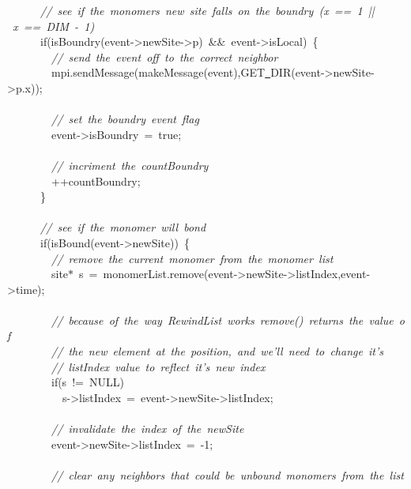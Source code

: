 {\ \ \ \ \ \ \textsl{//\ see\ if\ the\ monomers\ new\ site\ falls\ on\ the\ boundry\ (x\ ==\ 1\ ||\ x\ ==\ DIM\ -{}\ 1)}\\
\ \ \ \ \ \ if(isBoundry(event-{}>{}newSite-{}>{}p)\ \&\&\ event-{}>{}isLocal)\ \{\\
\ \ \ \ \ \ \ \ \textsl{//\ send\ the\ event\ off\ to\ the\ correct\ neighbor}\\
\ \ \ \ \ \ \ \ mpi.sendMessage(makeMessage(event),GET\underline\ DIR(event-{}>{}newSite-{}>{}p.x));\\
\ \\
\ \ \ \ \ \ \ \ \textsl{//\ set\ the\ boundry\ event\ flag}\\
\ \ \ \ \ \ \ \ event-{}>{}isBoundry\ =\ true;\\
\ \\
\ \ \ \ \ \ \ \ \textsl{//\ incriment\ the\ countBoundry}\\
\ \ \ \ \ \ \ \ ++countBoundry;\\
\ \ \ \ \ \ \}\\
\ \\
\ \ \ \ \ \ \textsl{//\ see\ if\ the\ monomer\ will\ bond}\\
\ \ \ \ \ \ if(isBound(event-{}>{}newSite))\ \{\\
\ \ \ \ \ \ \ \ \textsl{//\ remove\ the\ current\ monomer\ from\ the\ monomer\ list}\\
\ \ \ \ \ \ \ \ site$\ast$\ s\ =\ monomerList.remove(event-{}>{}newSite-{}>{}listIndex,event-{}>{}time);\\
\ \\
\ \ \ \ \ \ \ \ \textsl{//\ because\ of\ the\ way\ RewindList\ works\ remove()\ returns\ the\ value\ of}\\
\ \ \ \ \ \ \ \ \textsl{//\ the\ new\ element\ at\ the\ position,\ and\ we'll\ need\ to\ change\ it's}\\
\ \ \ \ \ \ \ \ \textsl{//\ listIndex\ value\ to\ reflect\ it's\ new\ index}\\
\ \ \ \ \ \ \ \ if(s\ !=\ NULL)\\
\ \ \ \ \ \ \ \ \ \ s-{}>{}listIndex\ =\ event-{}>{}newSite-{}>{}listIndex;\\
\ \\
\ \ \ \ \ \ \ \ \textsl{//\ invalidate\ the\ index\ of\ the\ newSite}\\
\ \ \ \ \ \ \ \ event-{}>{}newSite-{}>{}listIndex\ =\ -{}1;\\
\ \\
\ \ \ \ \ \ \ \ \textsl{//\ clear\ any\ neighbors\ that\ could\ be\ unbound\ monomers\ from\ the\ list}\\
}
